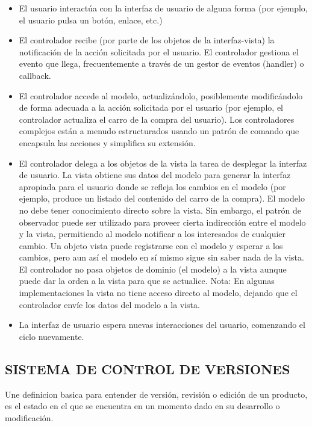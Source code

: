\begin{itemize}
  \item El usuario interactúa con la interfaz de usuario de alguna forma (por ejemplo, el usuario pulsa un botón, enlace, etc.)
  \item El controlador recibe (por parte de los objetos de la interfaz-vista) la notificación de la acción solicitada por el usuario. El controlador gestiona el evento que llega, frecuentemente a través de un gestor de eventos (handler) o callback.
  \item El controlador accede al modelo, actualizándolo, posiblemente modificándolo de forma adecuada a la acción solicitada por el usuario (por ejemplo, el controlador actualiza el carro de la compra del usuario). Los controladores complejos están a menudo estructurados usando un patrón de comando que encapsula las acciones y simplifica su extensión.
  \item El controlador delega a los objetos de la vista la tarea de desplegar la interfaz de usuario. La vista obtiene sus datos del modelo para generar la interfaz apropiada para el usuario donde se refleja los cambios en el modelo (por ejemplo, produce un listado del contenido del carro de la compra). El modelo no debe tener conocimiento directo sobre la vista. Sin embargo, el patrón de observador puede ser utilizado para proveer cierta indirección entre el modelo y la vista, permitiendo al modelo notificar a los interesados de cualquier cambio. Un objeto vista puede registrarse con el modelo y esperar a los cambios, pero aun así el modelo en sí mismo sigue sin saber nada de la vista. El controlador no pasa objetos de dominio (el modelo) a la vista aunque puede dar la orden a la vista para que se actualice. Nota: En algunas implementaciones la vista no tiene acceso directo al modelo, dejando que el controlador envíe los datos del modelo a la vista.
  \item La interfaz de usuario espera nuevas interacciones del usuario, comenzando el ciclo nuevamente.
\end{itemize}

\subsection{SISTEMA DE CONTROL DE VERSIONES}

Une definicion basica para entender de versión, revisión o edición de un producto, es el estado en el que se encuentra en un momento dado en su desarrollo o modificación.\\

